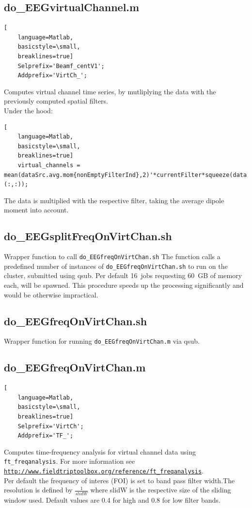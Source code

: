 \documentclass[12pt,a4paper]{scrartcl}
\begin{document}
\subsection{do\_EEGvirtualChannel.m}
\begin{lstlisting}[
    language=Matlab,
    basicstyle=\small,
    breaklines=true]
    Selprefix='Beamf_centV1';
    Addprefix='VirtCh_';
\end{lstlisting}
Computes virtual channel time series, by mutliplying the data with the previously computed spatial filters.\\

\noindent Under the hood:
\begin{lstlisting}[
    language=Matlab,
    basicstyle=\small,
    breaklines=true]
    virtual_channels = mean(dataSrc.avg.mom{nonEmptyFilterInd},2)'*currentFilter*squeeze(data.trial{trial}(:,:));
\end{lstlisting}

The data is multiplied with the respective filter, taking the average dipole moment into account.

\subsection{do\_EEGsplitFreqOnVirtChan.sh}
\label{sec:freqVirt}
Wrapper function to call \texttt{do\_EEGfreqOnVirtChan.sh} The function calls a predefined number of instances of \texttt{do\_EEGfreqOnVirtChan.sh} to run on the cluster, submitted using qsub. Per default 16~jobs requesting 60~GB of memory each, will be spawned. This procedure speeds up the processing significantly and would be otherwise impractical.\\

\subsection{do\_EEGfreqOnVirtChan.sh}
Wrapper function for running \texttt{do\_EEGfreqOnVirtChan.m} via qsub.

\subsection{do\_EEGfreqOnVirtChan.m}
\begin{lstlisting}[
    language=Matlab,
    basicstyle=\small,
    breaklines=true]
    Selprefix='VirtCh';
    Addprefix='TF_';
\end{lstlisting}
Computes time-frequency analysis for virtual channel data using \texttt{ft\_freqanalysis}. For more information see \href{http://www.fieldtriptoolbox.org/reference/ft\_freqanalysis}{\nolinkurl{http://www.fieldtriptoolbox.org/reference/ft\_freqanalysis}}.\\
\noindent Per default the frequency of interes (FOI) is set to band pass filter width.The resolution is defined by $\frac{1}{slidW}$ where slidW is the respective size of the sliding window used. Default values are 0.4 for high and 0.8 for low filter bands.\\
\end{document}
